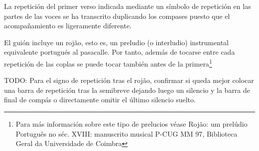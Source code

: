 \noindent La repetición del primer verso indicada mediante un símbolo de repetición en las partes de las voces se ha transcrito duplicando los compases puesto que el acompañamiento es ligeramente diferente.


\noindent El guión incluye un rojão, esto es, un preludio (o interludio) instrumental equivalente portugués al pasacalle. Por tanto, además de tocarse entre cada repetición de las coplas se puede tocar también antes de la primera\footnote{Para más información sobre este tipo de prelucios véase Rojão: um prelúdio Português no séc. XVIII: manuscrito musical P-CUG MM 97, Biblioteca Geral da Universidade de Coimbra}

TODO: Para el signo de repetición tras el rojão, confirmar si queda mejor colocar una barra de repetición tras la semibreve dejando luego un silencio y la barra de final de compás o directamente omitir el último silencio suelto.
